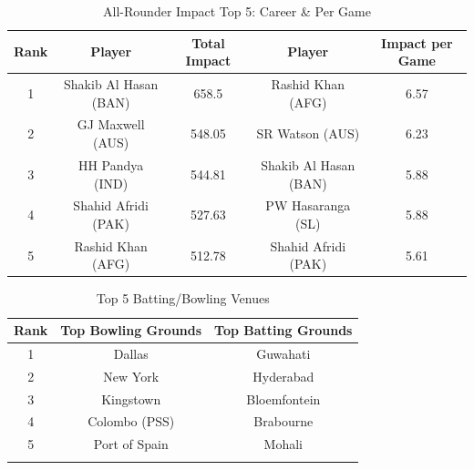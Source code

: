 \documentclass{article}[12pt]
\begin{document}
\begin{table}[!h]
\centering
\begin{tabular}{ccccc} \hline
\textbf{Rank} & \textbf{Player} & \textbf{Total Impact} & \textbf{Player} & \textbf{Impact per Game} \\ \hline
1 & Shakib Al Hasan (BAN) & 658.5 & Rashid Khan (AFG) & 6.57 \\
2 & GJ Maxwell (AUS) & 548.05 & SR Watson (AUS) & 6.23 \\
3 & HH Pandya (IND) & 544.81 & Shakib Al Hasan (BAN) & 5.88 \\
4 & Shahid Afridi (PAK) & 527.63 & PW Hasaranga (SL) & 5.88 \\
5 & Rashid Khan (AFG) & 512.78 & Shahid Afridi (PAK) & 5.61 \\ \hline
\end{tabular}
\caption{All-Rounder Impact Top 5: Career \& Per Game}
\label{tab:allroundimpact}
\end{table}

\begin{table}[!h]
\centering
\begin{tabular}{ccc} \hline
\textbf{Rank} & \textbf{Top Bowling Grounds} & \textbf{Top Batting Grounds} \\ \hline
1 & Dallas & Guwahati \\
2 & New York & Hyderabad \\
3 & Kingstown & Bloemfontein \\
4 & Colombo (PSS) & Brabourne \\
5 & Port of Spain & Mohali \\ \hline
\multicolumn{1}{l}{} & \multicolumn{1}{l}{} & \multicolumn{1}{l}{}
\end{tabular}
\caption{Top 5 Batting/Bowling Venues}
\label{tab:venues}
\end{table}
\end{document}
